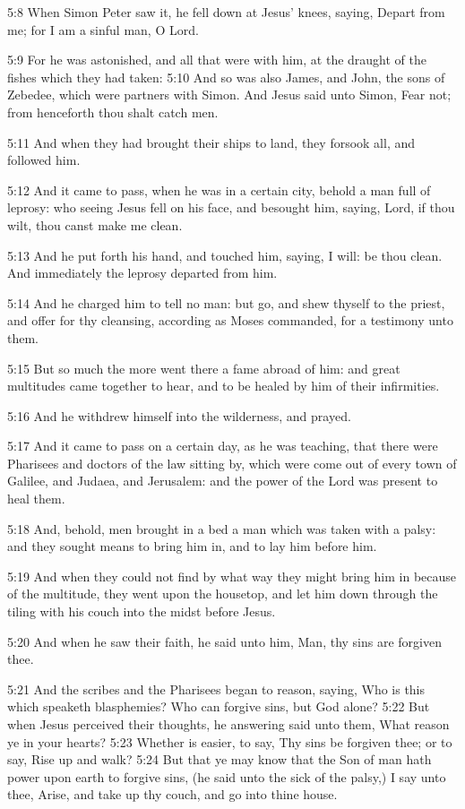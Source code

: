5:8 When Simon Peter saw it, he fell down at Jesus' knees, saying, Depart from me; for I am a sinful man, O Lord.

5:9 For he was astonished, and all that were with him, at the draught of the fishes which they had taken: 5:10 And so was also James, and John, the sons of Zebedee, which were partners with Simon. And Jesus said unto Simon, Fear not; from henceforth thou shalt catch men.

5:11 And when they had brought their ships to land, they forsook all, and followed him.

5:12 And it came to pass, when he was in a certain city, behold a man full of leprosy: who seeing Jesus fell on his face, and besought him, saying, Lord, if thou wilt, thou canst make me clean.

5:13 And he put forth his hand, and touched him, saying, I will: be thou clean. And immediately the leprosy departed from him.

5:14 And he charged him to tell no man: but go, and shew thyself to the priest, and offer for thy cleansing, according as Moses commanded, for a testimony unto them.

5:15 But so much the more went there a fame abroad of him: and great multitudes came together to hear, and to be healed by him of their infirmities.

5:16 And he withdrew himself into the wilderness, and prayed.

5:17 And it came to pass on a certain day, as he was teaching, that there were Pharisees and doctors of the law sitting by, which were come out of every town of Galilee, and Judaea, and Jerusalem: and the power of the Lord was present to heal them.

5:18 And, behold, men brought in a bed a man which was taken with a palsy: and they sought means to bring him in, and to lay him before him.

5:19 And when they could not find by what way they might bring him in because of the multitude, they went upon the housetop, and let him down through the tiling with his couch into the midst before Jesus.

5:20 And when he saw their faith, he said unto him, Man, thy sins are forgiven thee.

5:21 And the scribes and the Pharisees began to reason, saying, Who is this which speaketh blasphemies? Who can forgive sins, but God alone?  5:22 But when Jesus perceived their thoughts, he answering said unto them, What reason ye in your hearts?  5:23 Whether is easier, to say, Thy sins be forgiven thee; or to say, Rise up and walk?  5:24 But that ye may know that the Son of man hath power upon earth to forgive sins, (he said unto the sick of the palsy,) I say unto thee, Arise, and take up thy couch, and go into thine house.

